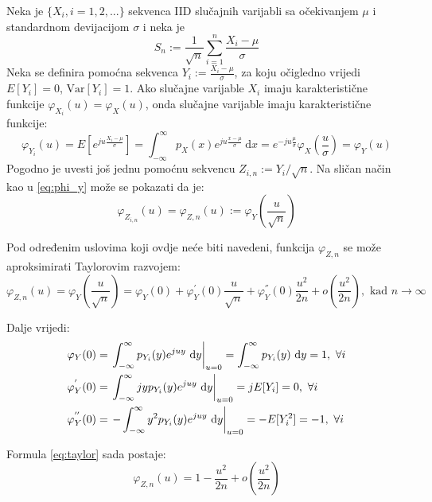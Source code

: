 Neka je $\{X_i, i=1,2,...\}$ sekvenca IID slučajnih varijabli sa očekivanjem
$\mu$ i standardnom devijacijom $\sigma$ i neka je
\begin{equation}
  S_n := \frac{1}{\sqrt{n}} \sum_{i=1}^{n} \frac{X_i-\mu}{\sigma}
\end{equation}
Neka se definira pomoćna sekvenca $Y_i := \frac{X_i-\mu}{\sigma}$, za koju
očigledno vrijedi $E[Y_i] = 0$, $\text{Var}[Y_i] = 1$. Ako slučajne varijable
$X_i$ imaju karakteristične funkcije $\varphi_{X_i}(u) = \varphi_X(u)$, onda
slučajne varijable imaju karakteristične funkcije:
\begin{equation} \label{eq:phi_y}
  \varphi_{Y_i}(u) = E\left[e^{ju\frac{X_i-\mu}{\sigma}}\right]
  = \int_{-\infty}^{\infty} p_X(x)e^{ju\frac{x-\mu}{\sigma}} \ \mathrm dx
  = e^{-ju\frac{\mu}{\sigma}} \varphi_X\left(\frac{u}{\sigma}\right)
  = \varphi_Y(u)
\end{equation}
Pogodno je uvesti još jednu pomoćnu sekvencu $Z_{i,n} := Y_i/\sqrt{n}$. Na
sličan način kao u \eqref{eq:phi_y} može se pokazati da je:
\begin{equation}
  \varphi_{Z_{i,n}}(u)
  = \varphi_{Z,n}(u) := \varphi_Y\left(\frac{u}{\sqrt{n}}\right)
\end{equation}

Pod određenim uslovima koji ovdje neće biti navedeni, funkcija $\varphi_{Z,n}$
se može aproksimirati Taylorovim razvojem:
\begin{equation} \label{eq:taylor}
  \varphi_{Z,n}(u) = \varphi_Y\left(\frac{u}{\sqrt{n}}\right) 
  = \varphi_Y(0) + \varphi_Y^{'}(0)\frac{u}{\sqrt{n}}
  + \varphi_Y^{''}(0)\frac{u^2}{2n} + o\left(\frac{u^2}{2n}\right),
    \text{ kad } n\to\infty
\end{equation}

Dalje vrijedi:
\begin{align*}
  \varphi_Y(0)
    &= \left.\int_{-\infty}^{\infty} p_{Y_i}(y) e^{juy} \ \text dy\right|_{u=0}
    = \int_{-\infty}^{\infty} p_{Y_i}(y) \ \text dy = 1,\  \forall i \\
  \varphi_Y^{'}(0)
    &= \left.\int_{-\infty}^{\infty} jyp_{Y_i}(y)e^{juy} \ \text dy \right|_{u=0}
    = jE[Y_i] = 0,\ \forall i \\
  \varphi_Y^{''}(0)
    &= \left.-\int_{-\infty}^{\infty} y^2 p_{Y_i}(y)e^{juy} \ \text dy\right|_{u=0}
    = -E[Y_i^2] = -1,\ \forall i
\end{align*}

Formula \eqref{eq:taylor} sada postaje:
\begin{equation}
  \varphi_{Z,n}(u) = 1 - \frac{u^2}{2n} + o\left(\frac{u^2}{2n}\right)
\end{equation}

